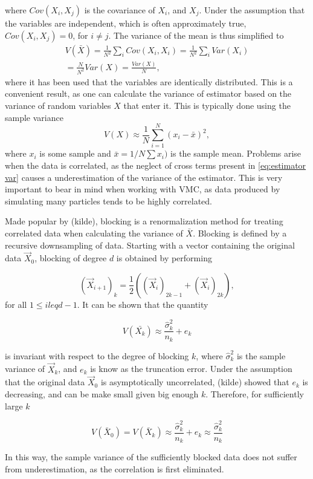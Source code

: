 where $Cov(X_i, X_j)$ is the covariance of $X_i$, and $X_j$. Under the assumption that the variables are independent, which is often approximately true, $Cov(X_i, X_j) = 0$, for $i \neq j$. The variance of the mean is thus simplified to 
\begin{equation*}
\begin{split}
	V(\bar{X}) = \frac{1}{N^2}\sum_{i}{Cov(X_i, X_i)} = \frac{1}{N^2}\sum_{i}{Var(X_i)} \\
	=\frac{N}{N^2}Var(X) = \frac{Var(X)}{N},
\end{split}
\end{equation*} 
where it has been used that the variables are identically distributed. This is a convenient result, as one can calculate the variance of estimator based on the variance of random variables $X$ that enter it. This is typically done using the sample variance
\begin{equation*}
	V(X) \approx \frac{1}{N}\sum_{i=1}^{N}{(x_i - \bar{x})^2},
\end{equation*}
where $x_i$ is some sample and $\bar{x} = 1/N\sum{x_i)}$ is the sample mean. Problems arise when the data is correlated, as the neglect of cross terms present in \autoref{eq:estimator var} causes a underestimation of the variance of the estimator. This is very important to bear in mind when working with VMC, as data produced by simulating many particles tends to be highly correlated.

Made popular by (kilde), blocking is a renormalization method for treating correlated data when calculating the variance of $\bar{X}$. Blocking is defined by a recursive downsampling of data. Starting with a vector containing the original data $\vec{X}_0$, blocking of degree $d$ is obtained by performing

\begin{equation*}
	(\vec{X}_{i+1})_k = \frac{1}{2}((\vec{X}_{i})_{2k -1} + (\vec{X}_{i})_{2k}),
\end{equation*}
for all $1 \leq i leq d-1$. 
\newline
It can be shown that the quantity 

\begin{equation*}
	V(\bar{X_k}) \approx \frac{\hat{\sigma}_k^2}{n_k} +  e_k
\end{equation*}

is invariant with respect to the degree of blocking $k$, where $\hat{\sigma}_k^2$ is the sample variance of $\vec{X}_k$, and $e_k$ is know as the truncation error. Under the assumption that the original data $\vec{X}_0$ is asymptotically uncorrelated, (kilde) showed that $e_k$ is decreasing, and can be make small given big enough $k$. Therefore, for sufficiently large $k$

\begin{equation}\label{eq:trunc}
V(\bar{X}_0) = V(\bar{X}_k) \approx \frac{\hat{\sigma}_k^2}{n_k} +  e_k \approx \frac{\hat{\sigma}_k^2}{n_k}
\end{equation}

In this way, the sample variance of the sufficiently blocked data does not suffer from underestimation, as the correlation is first eliminated. 
  